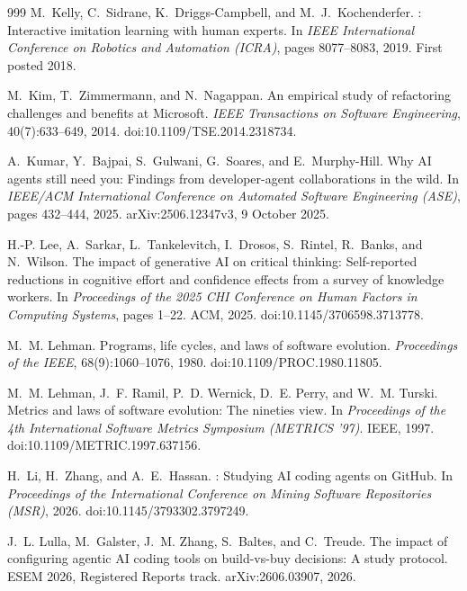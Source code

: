 \documentclass[11pt,a4paper]{article}
\begin{document}
\begin{thebibliography}{999}
M.~Kelly, C.~Sidrane, K.~Driggs-Campbell, and M.~J.~Kochenderfer.
: Interactive imitation learning with human experts.
\newblock In \emph{IEEE International Conference on Robotics and Automation
  (ICRA)}, pages 8077--8083, 2019.
\newblock First posted 2018.

\begingroup
\raggedright
M.~Kim, T.~Zimmermann, and N.~Nagappan.
\newblock An empirical study of refactoring challenges and benefits at
{Microsoft}.
\newblock \emph{IEEE Transactions on Software Engineering}, 40(7):633--649, 2014.
\newblock doi:10.1109/TSE.2014.2318734.
\par
\endgroup

A.~Kumar, Y.~Bajpai, S.~Gulwani, G.~Soares, and E.~Murphy-Hill.
\newblock Why {AI} agents still need you: Findings from developer-agent
collaborations in the wild.
\newblock In \emph{IEEE/ACM International Conference on Automated Software
Engineering (ASE)}, pages 432--444, 2025.
\newblock arXiv:2506.12347v3, 9 October 2025.

H.-P. Lee, A.~Sarkar, L.~Tankelevitch, I.~Drosos, S.~Rintel, R.~Banks, and
N.~Wilson.
\newblock The impact of generative {AI} on critical thinking: Self-reported
reductions in cognitive effort and confidence effects from a survey of
knowledge workers.
\newblock In \emph{Proceedings of the 2025 CHI Conference on Human Factors in
Computing Systems}, pages 1--22. ACM, 2025.
\newblock doi:10.1145/3706598.3713778.

M.~M. Lehman.
\newblock Programs, life cycles, and laws of software evolution.
\newblock \emph{Proceedings of the IEEE}, 68(9):1060--1076, 1980.
\newblock doi:10.1109/PROC.1980.11805.

M.~M. Lehman, J.~F. Ramil, P.~D. Wernick, D.~E. Perry, and W.~M. Turski.
\newblock Metrics and laws of software evolution: The nineties view.
\newblock In \emph{Proceedings of the 4th International Software Metrics
Symposium (METRICS '97)}. IEEE, 1997.
\newblock doi:10.1109/METRIC.1997.637156.

H.~Li, H.~Zhang, and A.~E.~Hassan.
: Studying {AI} coding agents on {GitHub}.
\newblock In \emph{Proceedings of the International Conference on Mining
  Software Repositories (MSR)}, 2026.
\newblock doi:10.1145/3793302.3797249.

J.~L. Lulla, M.~Galster, J.~M. Zhang, S.~Baltes, and C.~Treude.
\newblock The impact of configuring agentic {AI} coding tools on build-vs-buy
decisions: A study protocol.
\newblock ESEM 2026, Registered Reports track\@. arXiv:2606.03907, 2026.


\end{thebibliography}
\end{document}
